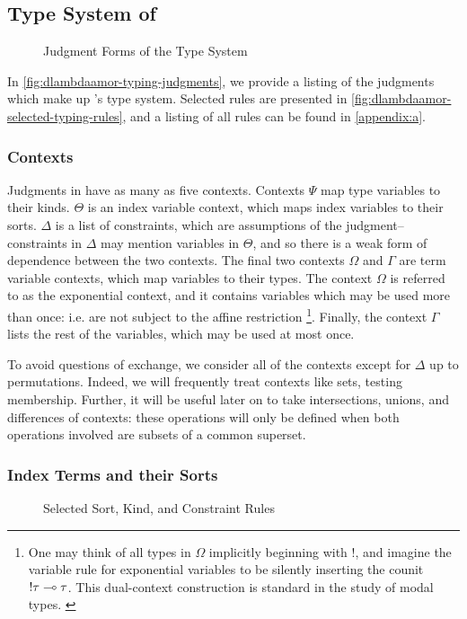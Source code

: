 \subsection{Type System of \dlambdaamor}
\begin{figure}

\caption{Judgment Forms of the \dlambdaamor Type System}
\label{fig:dlambdaamor-typing-judgments}
\end{figure}

In \autoref{fig:dlambdaamor-typing-judgments}, we provide a listing of the judgments which make up \dlambdaamor's type system. Selected rules are presented in \autoref{fig:dlambdaamor-selected-typing-rules}, and a listing of all rules can be found in \autoref{appendix:a}.

\subsubsection{Contexts}
Judgments in \dlambdaamor have as many as five contexts.
 Contexts $\Psi$ map type variables to their kinds. $\Theta$ is an index variable context, which maps index variables to their sorts. $\Delta$ is a list of constraints, which are assumptions of the judgment-- constraints in $\Delta$ may mention variables in $\Theta$, and so there is a weak form of dependence between the two contexts. The final two contexts $\Omega$ and $\Gamma$ are term variable contexts, which map variables to their types. The context $\Omega$ is referred to as the exponential context, and it contains variables which may be used more than once: i.e. are not subject to the affine restriction
\footnote{
One may think of all types in $\Omega$ implicitly beginning with $!$, and imagine the variable rule for exponential variables to be silently inserting the counit $!\tau \multimap \tau$. This dual-context construction is standard in the study of modal types. \cite{kavvos:lmcs}
}. Finally, the context $\Gamma$ lists the rest of the variables, which may be used at most once.

To avoid questions of exchange, we consider all of the contexts except for $\Delta$ up to permutations. Indeed, we will frequently treat contexts like sets, testing membership. Further, it will be useful later on to take intersections, unions, and differences of contexts: these operations will only be defined when both operations involved are subsets of a common superset.

\subsubsection{Index Terms and their Sorts}
\begin{figure}

\caption{Selected Sort, Kind, and Constraint Rules}
\label{fig:dlambdaamor-selected-sort-kind-constr-rules}
\end{figure}

